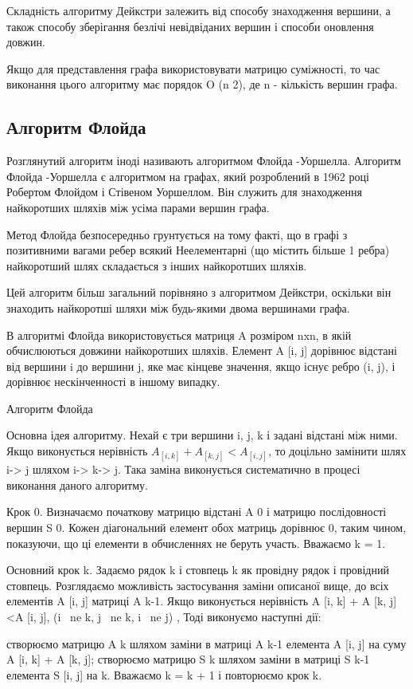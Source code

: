 Складність алгоритму Дейкстри залежить від способу знаходження вершини, а також способу зберігання безлічі невідвіданих вершин і способи оновлення довжин.

Якщо для представлення графа використовувати матрицю суміжності, то час виконання цього алгоритму має порядок O (n 2), де n - кількість вершин графа. 

\subsection{Алгоритм Флойда}
Розглянутий алгоритм іноді називають алгоритмом Флойда -Уоршелла. Алгоритм Флойда -Уоршелла є алгоритмом на графах, який розроблений в 1962 році Робертом Флойдом і Стівеном Уоршеллом. Він служить для знаходження найкоротших шляхів між усіма парами вершин графа.

Метод Флойда безпосередньо грунтується на тому факті, що в графі з позитивними вагами ребер всякий Неелементарні (що містить більше 1 ребра) найкоротший шлях складається з інших найкоротших шляхів.

Цей алгоритм більш загальний порівняно з алгоритмом Дейкстри, оскільки він знаходить найкоротші шляхи між будь-якими двома вершинами графа.

В алгоритмі Флойда використовується матриця A розміром nxn, в якій обчислюються довжини найкоротших шляхів. Елемент A [i, j] дорівнює відстані від вершини i до вершини j, яке має кінцеве значення, якщо існує ребро (i, j), і дорівнює нескінченності в іншому випадку.

Алгоритм Флойда

Основна ідея алгоритму. Нехай є три вершини i, j, k і задані відстані між ними. Якщо виконується нерівність $A_{[i, k]} + A_{[k, j]} < A_{[i, j]}$, то доцільно замінити шлях i-> j шляхом i-> k-> j. Така заміна виконується систематично в процесі виконання даного алгоритму.

Крок 0. Визначаємо початкову матрицю відстані A 0 і матрицю послідовності вершин S 0. Кожен діагональний елемент обох матриць дорівнює 0, таким чином, показуючи, що ці елементи в обчисленнях не беруть участь. Вважаємо k = 1.

Основний крок k. Задаємо рядок k і стовпець k як провідну рядок і провідний стовпець. Розглядаємо можливість застосування заміни описаної вище, до всіх елементів A [i, j] матриці A k-1. Якщо виконується нерівність A [i, k] + A [k, j] <A [i, j], (i \ ne k, j \ ne k, i \ ne j) , Тоді виконуємо наступні дії:

    створюємо матрицю A k шляхом заміни в матриці A k-1 елемента A [i, j] на суму A [i, k] + A [k, j];
    створюємо матрицю S k шляхом заміни в матриці S k-1 елемента S [i, j] на k. Вважаємо k = k + 1 і повторюємо крок k. 


